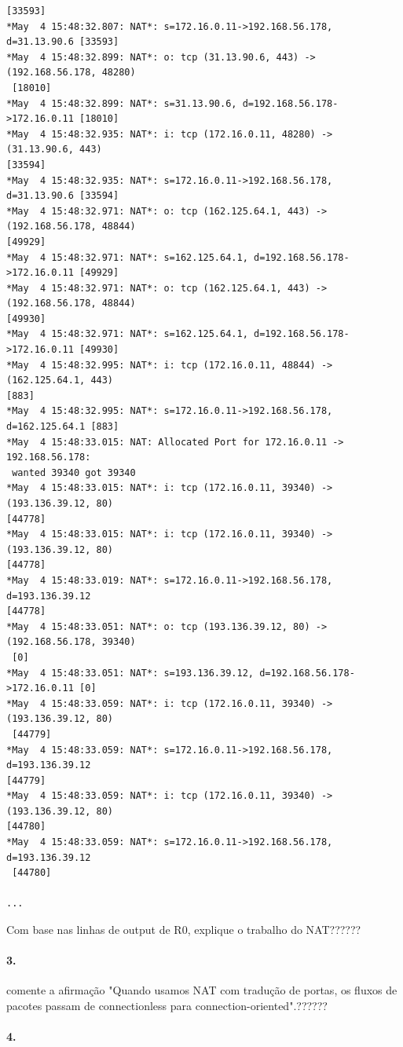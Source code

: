 \begin{verbatim}
[33593]
*May  4 15:48:32.807: NAT*: s=172.16.0.11->192.168.56.178, d=31.13.90.6 [33593]
*May  4 15:48:32.899: NAT*: o: tcp (31.13.90.6, 443) -> (192.168.56.178, 48280)
 [18010]
*May  4 15:48:32.899: NAT*: s=31.13.90.6, d=192.168.56.178->172.16.0.11 [18010]
*May  4 15:48:32.935: NAT*: i: tcp (172.16.0.11, 48280) -> (31.13.90.6, 443) 
[33594]
*May  4 15:48:32.935: NAT*: s=172.16.0.11->192.168.56.178, d=31.13.90.6 [33594]
*May  4 15:48:32.971: NAT*: o: tcp (162.125.64.1, 443) -> (192.168.56.178, 48844) 
[49929]
*May  4 15:48:32.971: NAT*: s=162.125.64.1, d=192.168.56.178->172.16.0.11 [49929]
*May  4 15:48:32.971: NAT*: o: tcp (162.125.64.1, 443) -> (192.168.56.178, 48844) 
[49930]
*May  4 15:48:32.971: NAT*: s=162.125.64.1, d=192.168.56.178->172.16.0.11 [49930]
*May  4 15:48:32.995: NAT*: i: tcp (172.16.0.11, 48844) -> (162.125.64.1, 443) 
[883]
*May  4 15:48:32.995: NAT*: s=172.16.0.11->192.168.56.178, d=162.125.64.1 [883]
*May  4 15:48:33.015: NAT: Allocated Port for 172.16.0.11 -> 192.168.56.178:
 wanted 39340 got 39340
*May  4 15:48:33.015: NAT*: i: tcp (172.16.0.11, 39340) -> (193.136.39.12, 80) 
[44778]
*May  4 15:48:33.015: NAT*: i: tcp (172.16.0.11, 39340) -> (193.136.39.12, 80)
[44778]
*May  4 15:48:33.019: NAT*: s=172.16.0.11->192.168.56.178, d=193.136.39.12 
[44778]
*May  4 15:48:33.051: NAT*: o: tcp (193.136.39.12, 80) -> (192.168.56.178, 39340)
 [0]
*May  4 15:48:33.051: NAT*: s=193.136.39.12, d=192.168.56.178->172.16.0.11 [0]
*May  4 15:48:33.059: NAT*: i: tcp (172.16.0.11, 39340) -> (193.136.39.12, 80)
 [44779]
*May  4 15:48:33.059: NAT*: s=172.16.0.11->192.168.56.178, d=193.136.39.12 
[44779]
*May  4 15:48:33.059: NAT*: i: tcp (172.16.0.11, 39340) -> (193.136.39.12, 80) 
[44780]
*May  4 15:48:33.059: NAT*: s=172.16.0.11->192.168.56.178, d=193.136.39.12
 [44780]

...
\end{verbatim}

Com base nas linhas de output de R0, explique o trabalho do NAT??????


\paragraph{3.}
comente a afirmação "Quando usamos NAT com tradução de portas, os fluxos de pacotes passam de connectionless para connection-oriented".??????


\paragraph{4.}

